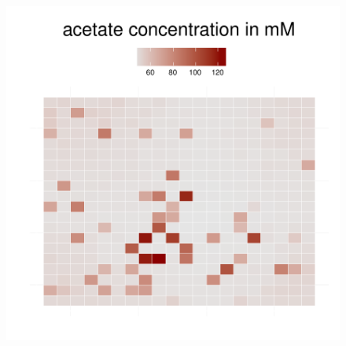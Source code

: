 \begin{figure}[h]
{\begin{minipage}[t]{0.3\textwidth}
  \end{minipage}
  \begin{minipage}[t]{0.3\textwidth}
    \includegraphics[width=\textwidth]{../results/Bcoli_20x20_seed176_ace50.pdf}
  \end{minipage}
  }
\end{figure}
